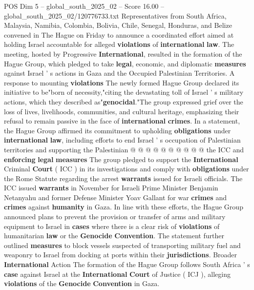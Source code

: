 \begin{textsample}{POS Dim 5 – global\_south\_2025\_02 – Score 16.00 – global\_south\_2025\_02/120776733.txt}  \label{ex:f5_pos_215}
Representatives from South Africa, Malaysia, Namibia, Colombia, Bolivia, Chile, Senegal, Honduras, and Belize convened in The Hague on Friday to announce a coordinated effort aimed at holding Israel accountable for alleged \textbf{violations} of \textbf{international} \textbf{law}.
The meeting, hosted by Progressive \textbf{International}, resulted in the formation of the Hague Group, which pledged to take \textbf{legal}, economic, and diplomatic \textbf{measures} against Israel ' s actions in Gaza and the Occupied Palestinian Territories.
A response to mounting \textbf{violations} The newly formed Hague Group declared its initiative to be"born of necessity,"citing the devastating toll of Israel ' s military actions, which they described as"\textbf{genocidal}."The group expressed grief over the loss of lives, livelihoods, communities, and cultural heritage, emphasizing their refusal to remain passive in the face of \textbf{international} \textbf{crimes}.
In a statement, the Hague Group affirmed its commitment to upholding \textbf{obligations} under \textbf{international} \textbf{law}, including efforts to end Israel ' s occupation of Palestinian territories and supporting the Palestinian @ @ @ @ @ @ @ @ @ @ the ICC and \textbf{enforcing} \textbf{legal} \textbf{measures} The group pledged to support the \textbf{International} Criminal \textbf{Court} ( ICC ) in its investigations and comply with \textbf{obligations} under the Rome Statute regarding the arrest \textbf{warrants} issued for Israeli officials.
The ICC issued \textbf{warrants} in November for Israeli Prime Minister Benjamin Netanyahu and former Defense Minister Yoav Gallant for war \textbf{crimes} and \textbf{crimes} against \textbf{humanity} in Gaza.
In line with these efforts, the Hague Group announced plans to prevent the provision or transfer of arms and military equipment to Israel in \textbf{cases} where there is a clear risk of \textbf{violations} of humanitarian \textbf{law} or the \textbf{Genocide} \textbf{Convention}.
The statement further outlined \textbf{measures} to block vessels suspected of transporting military fuel and weaponry to Israel from docking at ports within their \textbf{jurisdictions}.
Broader \textbf{International} Action The formation of the Hague Group follows South Africa ' s \textbf{case} against Israel at the \textbf{International} \textbf{Court} of Justice ( ICJ ), alleging \textbf{violations} of the \textbf{Genocide} \textbf{Convention} in Gaza.

\end{textsample}
